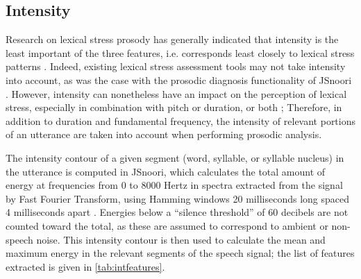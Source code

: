 	\subsection{Intensity}
	\label{sec:prosody:intensity}
	
		
		Research on lexical stress prosody has generally indicated that intensity is the least important of the three features, i.e. corresponds least closely to lexical stress patterns \citep{Cutler2005}. 
Indeed, existing lexical stress assessment tools may not take intensity into account, as 
was the case with the prosodic diagnosis functionality of JSnoori .
However, intensity can nonetheless have an impact on the perception of lexical stress, especially in combination with pitch or duration, or both \citep{Cutler2005}; %
Therefore, in addition to duration and fundamental frequency, the intensity of relevant portions of an utterance are taken into account when performing prosodic analysis.




	The intensity contour of a given segment (word, syllable, or syllable nucleus) in the utterance is computed in JSnoori, which calculates the total amount of energy at frequencies from 0 to 8000 Hertz in spectra extracted from the signal by Fast Fourier Transform, using Hamming windows 20 milliseconds long spaced 4 milliseconds apart . Energies below a ``silence threshold'' of 60 decibels are not counted toward the total, as these are assumed to correspond to ambient or non-speech noise.  
	This intensity contour is then used to calculate the mean and maximum energy in the relevant segments of the speech signal; the list of features extracted is given in \cref{tab:intfeatures}.
	
	
	
